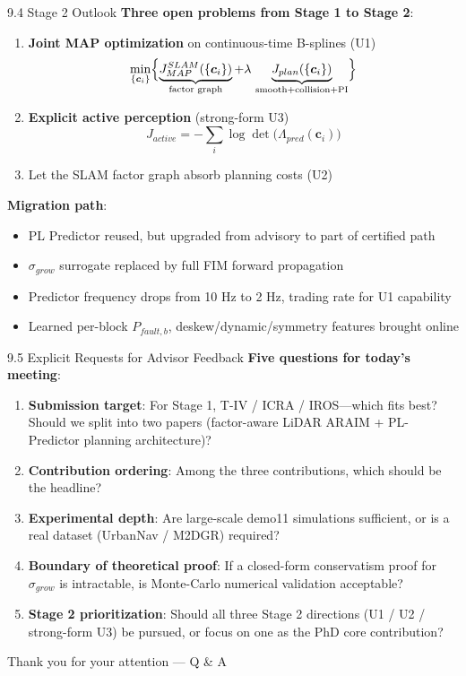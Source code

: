 \documentclass[10pt,aspectratio=169,xcolor=dvipsnames]{beamer}
\newcommand{\1}{\mathbb{1}}
\begin{document}
\begin{frame}{9.4 Stage 2 Outlook}
  \small
  \textbf{Three open problems from Stage 1 to Stage 2}:
  \begin{enumerate}
    \item \textbf{Joint MAP optimization} on continuous-time B-splines (U1)
      \[
        \min_{\{\bm{c}_i\}}\Bigl\{\underbrace{J_{MAP}^{SLAM}(\{\bm{c}_i\})}_{\text{factor graph}}+\lambda\,\underbrace{J_{plan}(\{\bm{c}_i\})}_{\text{smooth+collision+PI}}\Bigr\}
      \]
    \item \textbf{Explicit active perception} (strong-form U3)
      \[
        J_{active}=-\sum_i\log\det\!\bigl(\Lambda_{pred}(\bm{c}_i)\bigr)
      \]
    \item Let the SLAM factor graph absorb planning costs (U2)
  \end{enumerate}

  \medskip
  \textbf{Migration path}:
  \begin{itemize}\scriptsize
    \item PL Predictor reused, but upgraded from advisory to part of certified path
    \item $\sigma_{grow}$ surrogate replaced by full FIM forward propagation
    \item Predictor frequency drops from 10 Hz to 2 Hz, trading rate for U1 capability
    \item Learned per-block $P_{fault,b}$, deskew/dynamic/symmetry features brought online
  \end{itemize}
\end{frame}

\begin{frame}{9.5 Explicit Requests for Advisor Feedback}
  \small
  \textbf{Five questions for today's meeting}:

  \begin{enumerate}
    \item \textbf{Submission target}: For Stage 1, T-IV / ICRA / IROS---which fits best? Should we split into two papers (factor-aware LiDAR ARAIM + PL-Predictor planning architecture)?
    \item \textbf{Contribution ordering}: Among the three contributions, which should be the headline?
    \item \textbf{Experimental depth}: Are large-scale demo11 simulations sufficient, or is a real dataset (UrbanNav / M2DGR) required?
    \item \textbf{Boundary of theoretical proof}: If a closed-form conservatism proof for $\sigma_{grow}$ is intractable, is Monte-Carlo numerical validation acceptable?
    \item \textbf{Stage 2 prioritization}: Should all three Stage 2 directions (U1 / U2 / strong-form U3) be pursued, or focus on one as the PhD core contribution?
  \end{enumerate}

  \vspace{6pt}
  \begin{block}{}
    \centering\small Thank you for your attention --- Q \& A
  \end{block}
\end{frame}
\end{document}
